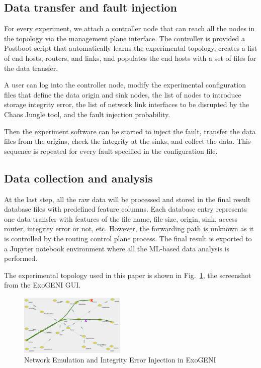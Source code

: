 \subsection{Data transfer and fault injection}
For every experiment, we attach a controller node that can reach all the nodes in the topology via the management plane interface. The controller is provided a Postboot script that automatically learns the experimental topology, creates a list of end hosts, routers, and links, and populates the end hosts with a set of files for the data transfer.

A user can log into the controller node, modify the experimental configuration files that define the data origin and sink nodes, the list of nodes to introduce storage integrity error, the list of network link interfaces to be disrupted by the Chaos Jungle tool, and the fault injection probability.

Then the experiment software can be started to inject the fault, transfer the data files from the origins, check the integrity at the sinks, and collect the data. This sequence is repeated for every fault specified in the configuration file.

\subsection{Data collection and analysis}
At the last step, all the raw data will be processed and stored in the final result database files with predefined feature columns. Each database entry represents one data transfer with features of the file name, file size, origin, sink, access router, integrity error or not, etc. However, the forwarding path is unknown as it is controlled by the routing control plane process. The final result is exported to a Jupyter notebook environment where all the ML-based data analysis is performed.

The experimental topology used in this paper is shown in Fig.~\ref{fig:topology}, the screenshot from the ExoGENI GUI.
\begin{figure}[!ht]
\begin{center}
\includegraphics[width=0.45\textwidth]{./figure/ChaosJungle}
\end{center}
\vspace{-0.05in}
\caption{Network Emulation and Integrity Error Injection in ExoGENI}
\vspace{-0.05in}
\label{fig:topology}
\end{figure}


